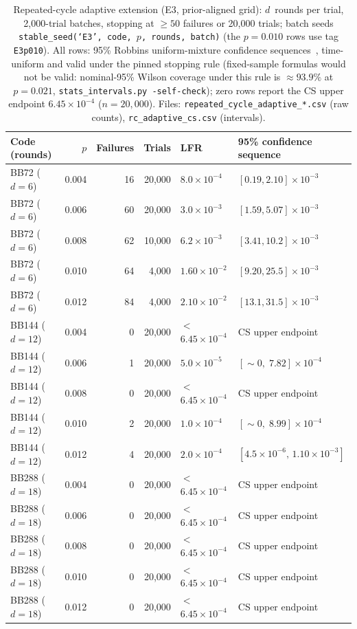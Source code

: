 \documentclass[pdflatex,sn-mathphys-num]{sn-jnl}
\theoremstyle{thmstyleone}
\theoremstyle{thmstyletwo}
\theoremstyle{thmstylethree}
\begin{document}
\begin{table}[htbp]\centering\small
\caption{Repeated-cycle adaptive extension (E3, prior-aligned grid): $d$~rounds per trial, 2{,}000-trial batches, stopping at $\ge50$ failures or 20{,}000 trials; batch seeds \texttt{stable\_seed(`E3',\,code,\,$p$,\,rounds,\,batch)} (the $p=0.010$ rows use tag \texttt{E3p010}). All rows: 95\% Robbins uniform-mixture confidence sequences~\cite{howard2021confidence}, time-uniform and valid under the pinned stopping rule (fixed-sample formulas would not be valid: nominal-95\% Wilson coverage under this rule is $\approx\!93.9\%$ at $p=0.021$, \texttt{stats\_intervals.py -self-check}); zero rows report the CS upper endpoint $6.45\times10^{-4}$ ($n=20{,}000$). Files: \texttt{repeated\_cycle\_adaptive\_*.csv} (raw counts), \texttt{rc\_adaptive\_cs.csv} (intervals).}\label{tab:rc_adaptive}
\begin{tabular}{@{}lrrrll@{}}
\toprule
Code (rounds) & $p$ & Failures & Trials & LFR & 95\% confidence sequence \\\midrule
BB72 ($d=6$)   & 0.004 & 16 & 20{,}000 & $8.0\times10^{-4}$ & $[0.19,2.10]\times10^{-3}$ \\
BB72 ($d=6$)   & 0.006 & 60 & 20{,}000 & $3.0\times10^{-3}$ & $[1.59,5.07]\times10^{-3}$ \\
BB72 ($d=6$)   & 0.008 & 62 & 10{,}000 & $6.2\times10^{-3}$ & $[3.41,10.2]\times10^{-3}$ \\
BB72 ($d=6$)   & 0.010 & 64 & 4{,}000  & $1.60\times10^{-2}$ & $[9.20,25.5]\times10^{-3}$ \\
BB72 ($d=6$)   & 0.012 & 84 & 4{,}000  & $2.10\times10^{-2}$ & $[13.1,31.5]\times10^{-3}$ \\\midrule
BB144 ($d=12$) & 0.004 & 0 & 20{,}000 & $<$$6.45\times10^{-4}$ & CS upper endpoint \\
BB144 ($d=12$) & 0.006 & 1 & 20{,}000 & $5.0\times10^{-5}$ & $[{\sim}0,\;7.82]\times10^{-4}$ \\
BB144 ($d=12$) & 0.008 & 0 & 20{,}000 & $<$$6.45\times10^{-4}$ & CS upper endpoint \\
BB144 ($d=12$) & 0.010 & 2 & 20{,}000 & $1.0\times10^{-4}$ & $[{\sim}0,\;8.99]\times10^{-4}$ \\
BB144 ($d=12$) & 0.012 & 4 & 20{,}000 & $2.0\times10^{-4}$ & $[4.5\times10^{-6},\,1.10\times10^{-3}]$ \\\midrule
BB288 ($d=18$) & 0.004 & 0 & 20{,}000 & $<$$6.45\times10^{-4}$ & CS upper endpoint \\
BB288 ($d=18$) & 0.006 & 0 & 20{,}000 & $<$$6.45\times10^{-4}$ & CS upper endpoint \\
BB288 ($d=18$) & 0.008 & 0 & 20{,}000 & $<$$6.45\times10^{-4}$ & CS upper endpoint \\
BB288 ($d=18$) & 0.010 & 0 & 20{,}000 & $<$$6.45\times10^{-4}$ & CS upper endpoint \\
BB288 ($d=18$) & 0.012 & 0 & 20{,}000 & $<$$6.45\times10^{-4}$ & CS upper endpoint \\
\bottomrule
\end{tabular}
\end{table}
\end{document}
